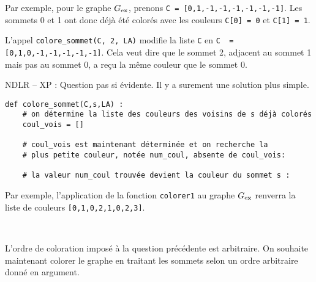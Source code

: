 Par exemple, pour le graphe ${G}_{\text{ex}}$, prenons \lstinline{C = [0,1,-1,-1,-1,-1,-1,-1]}. Les sommets 0 et 1 ont donc déjà été colorés avec les couleurs \lstinline{C[0] = 0} et \lstinline{C[1] = 1}.

L'appel \lstinline{colore_sommet(C, 2, LA)} modifie la liste \lstinline{C} en \lstinline{C  = [0,1,0,-1,-1,-1,-1,-1]}. Cela veut dire que le sommet 2, adjacent au sommet 1 mais pas au sommet 0, a reçu la même couleur que le sommet 0.


\ifprof
\begin{corrige}
NDLR -- XP : Question pas si évidente. Il y a surement une solution plus simple.



\end{corrige}

\else

\fi
\begin{lstlisting}
def colore_sommet(C,s,LA) :
    # on détermine la liste des couleurs des voisins de s déjà colorés
    coul_vois = []
    
    # coul_vois est maintenant déterminée et on recherche la
    # plus petite couleur, notée num_coul, absente de coul_vois:
    
    # la valeur num_coul trouvée devient la couleur du sommet s :
\end{lstlisting}

Par exemple, l'application de la fonction \lstinline{colorer1} au graphe ${G}_{\text{ex}}$ renverra la liste de couleurs \lstinline{[0,1,0,2,1,0,2,3]}.
\ifprof
\begin{corrige}~\\ \vspace{-.5cm}

\end{corrige}
\else
\fi


L'ordre de coloration imposé à la question précédente est arbitraire. On souhaite maintenant colorer le graphe en traitant les sommets selon un ordre arbitraire donné en argument.


